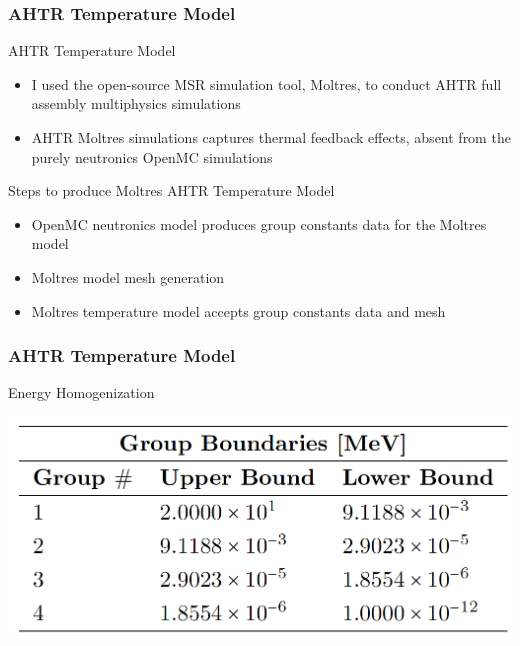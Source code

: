 \begin{frame}
    \frametitle{AHTR Temperature Model}
    \begin{block}{AHTR Temperature Model}
        \begin{itemize}
            \item I used the open-source MSR simulation tool, Moltres, to conduct AHTR
            full assembly multiphysics simulations 
            \item AHTR Moltres simulations captures thermal feedback effects, absent
            from the purely neutronics OpenMC simulations
        \end{itemize}
    \end{block}

    \begin{block}{Steps to produce Moltres AHTR Temperature Model}
        \begin{itemize}
          \item OpenMC neutronics model produces group constants data for the Moltres model
          \item Moltres model mesh generation
          \item Moltres temperature model accepts group constants data and mesh
        \end{itemize}
    \end{block}

\end{frame}

\begin{frame}
    \frametitle{AHTR Temperature Model}
    \begin{block}{Energy Homogenization}
        \begin{table}[]
            \centering
            \begin{minipage}[c]{0.6\textwidth}
                \centering
                \includegraphics[width=0.8\linewidth]{figures/ahtr-energy-discr.png}
            \end{minipage}\hfill
            \begin{minipage}[c]{0.4\textwidth}
            \caption{4-group energy structures for AHTR geometry 
            derived by \cite{gentry_development_2016}.}
        \end{minipage}
        \end{table}
    \end{block}
\end{frame}


